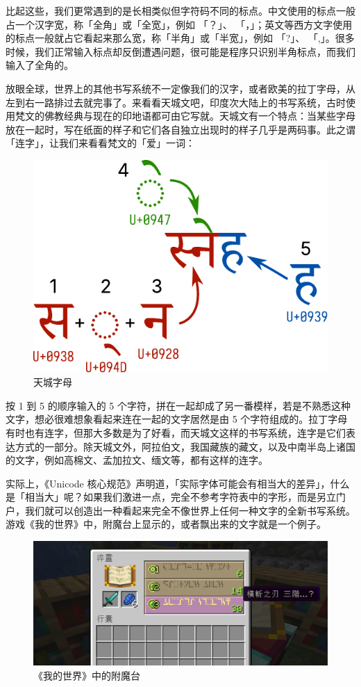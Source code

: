 \begin{note}
  比起这些，我们更常遇到的是长相类似但字符码不同的标点。中文使用的标点一般占一个汉字宽，称「全角」或「全宽」，例如  「？」、  「，」；英文等西方文字使用的标点一般就占它看起来那么宽，称「半角」或「半宽」，例如  「?」、  「,」。很多时候，我们正常输入标点却反倒遭遇问题，很可能是程序只识别半角标点，而我们输入了全角的。
\end{note}

放眼全球，世界上的其他书写系统不一定像我们的汉字，或者欧美的拉丁字母，从左到右一路排过去就完事了。来看看天城文吧，印度次大陆上的书写系统，古时使用梵文的佛教经典与现在的印地语都可由它写就。天城文有一个特点：当某些字母放在一起时，写在纸面的样子和它们各自独立出现时的样子几乎是两码事。此之谓「连字」，让我们来看看梵文的「爱」一词：

\begin{figure}[htb!]
  \centering
  \includegraphics[width=.45\textwidth]{assets/advanced/Devanagari.pdf}
  \caption{天城字母}
  \label{fig:Devanagari}
\end{figure}

按 1 到 5 的顺序输入的 5 个字符，拼在一起却成了另一番模样，若是不熟悉这种文字，想必很难想象看起来连在一起的文字居然是由 5 个字符组成的。拉丁字母有时也有连字，但那大多数是为了好看，而天城文这样的书写系统，连字是它们表达方式的一部分。除天城文外，阿拉伯文，我国藏族的藏文，以及中南半岛上诸国的文字，例如高棉文、孟加拉文、缅文等，都有这样的连字。

实际上，《Unicode 核心规范》声明道，「实际字体可能会有相当大的差异」，什么是「相当大」呢？如果我们激进一点，完全不参考字符表中的字形，而是另立门户，我们就可以创造出一种看起来完全不像世界上任何一种文字的全新书写系统。游戏《我的世界》中，附魔台上显示的，或者飘出来的文字就是一个例子。

\begin{figure}[htb!]
  \centering
  \includegraphics[width=.7\textwidth]{assets/advanced/EnchantingTable.png}
  \caption{《我的世界》中的附魔台}
  \label{fig:EnchantingTable}
\end{figure}

